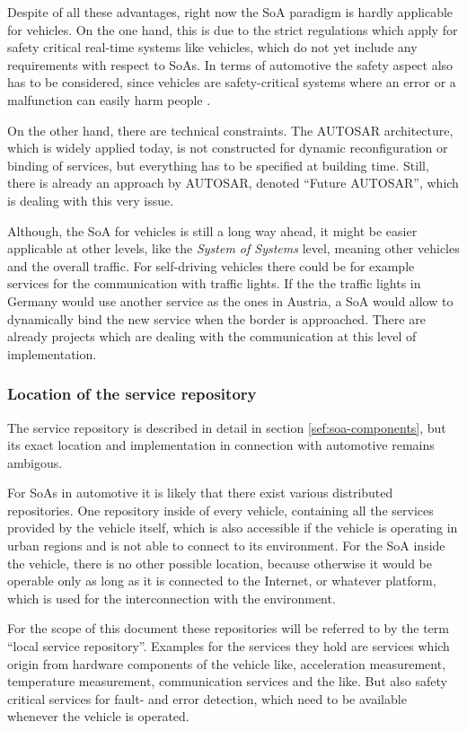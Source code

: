 Despite of all these advantages, right now the SoA paradigm is hardly applicable for vehicles. On the one hand, this is due to the strict regulations which apply for safety critical real-time systems like vehicles, which do not yet include any requirements with respect to SoAs. In terms of automotive the safety aspect also has to be considered, since vehicles are safety-critical systems where an error or a malfunction can easily harm people \cite{kum}.

On the other hand, there are technical constraints. The AUTOSAR architecture, which is widely applied today, is not constructed for dynamic reconfiguration or binding of services, but everything has to be specified at building time. Still, there is already an approach by AUTOSAR, denoted ``Future AUTOSAR'', which is dealing with this very issue.

Although, the SoA for vehicles is still a long way ahead, it might be easier applicable at other levels, like the \emph{System of Systems} level, meaning other vehicles and the overall traffic. For self-driving vehicles there could be for example services for the communication with traffic lights. If the the traffic lights in Germany would use another service as the ones in Austria, a SoA would allow to dynamically bind the new service when the border is approached. There are already projects which are dealing with the communication at this level of implementation.


\subsubsection*{Location of the service repository}
The service repository is described in detail in section \ref{sef:soa-components}, but its exact location and implementation in connection with automotive remains ambigous.

For SoAs in automotive it is likely that there exist various distributed repositories. One repository inside of every vehicle, containing all the services provided by the vehicle itself, which is also accessible if the vehicle is operating in urban regions and is not able to connect to its environment. For the SoA inside the vehicle, there is no other possible location, because otherwise it would be operable only as long as it is connected to the Internet, or whatever platform, which is used for the interconnection with the environment.

For the scope of this document these repositories will be referred to by the term ``local service repository''. Examples for the services they hold are services which origin from hardware components of the vehicle like, acceleration measurement, temperature measurement, communication services and the like. But also safety critical services for fault- and error detection, which need to be available whenever the vehicle is operated.

